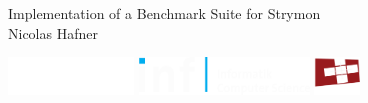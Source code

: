 \documentclass[14pt,t]{beamer}
\begin{document}
\begin{frame}[b,plain]
  \begin{center}
    {\LARGE Implementation of a Benchmark Suite for Strymon} \\
    \vspace{0.5cm}
    Nicolas Hafner \\
    \vfill
    \hspace*{-1cm}\begin{minipage}{\pagewidth}
      \begin{center}
        \hspace{0.5cm}
        \includegraphics[height=1cm]{../systems-cover/ethlogo_white.pdf}
        \hfill
        \includegraphics[height=1cm]{../systems-cover/inf-logo_white.pdf}
        \hfill
        \includegraphics[height=1cm]{../systems-cover/systemslogo-3colour_white.pdf}
        \hspace*{0.5cm}
      \end{center}
    \end{minipage} 
  \end{center}
\end{frame}

\begin{frame}
\end{frame}
\end{document}
